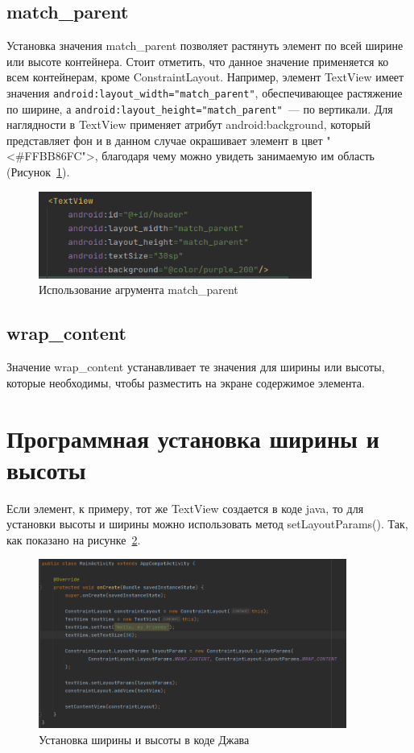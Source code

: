 \subsection{match\_parent}
Установка значения match\_parent позволяет растянуть элемент по всей
ширине или высоте контейнера. Стоит отметить, что данное значение
применяется ко всем контейнерам, кроме ConstraintLayout. Например,
элемент TextView имеет значения
\texttt{android:layout\_width="match\_parent"}, обеспечивающее растяжение
по ширине, а \texttt{android:layout\_height="match\_parent"}~--- по вертикали.
Для наглядности в TextView применяет атрибут android:background,
который представляет фон и в данном случае окрашивает элемент
в цвет "<\#FFBB86FC">, благодаря чему можно увидеть занимаемую им область
(Рисунок~\ref{fig:xm:set:hw}).

\begin{figure}[h!tp]
	\centering
	\includegraphics[width=0.8\textwidth]{Screenshot from 2023-03-10 12-42-04.png}
	\caption{Использование агрумента match\_parent}
	\label{fig:xm:set:hw}
\end{figure}

\subsection{wrap\_content}
Значение wrap\_content устанавливает те значения для ширины или высоты,
которые необходимы, чтобы разместить на экране содержимое элемента.

\section{Программная установка ширины и высоты}
Если элемент, к примеру, тот же TextView создается в коде java, то для
установки высоты и ширины можно использовать метод setLayoutParams().
Так, как показано на рисунке~\ref{fig:java:set:hw}.

\begin{figure}[h!tp]
	\centering
	\includegraphics[width=0.9\textwidth]{Screenshot from 2023-03-10 12-53-59.png}
	\caption{Установка ширины и высоты в коде Джава}
	\label{fig:java:set:hw}
\end{figure}


